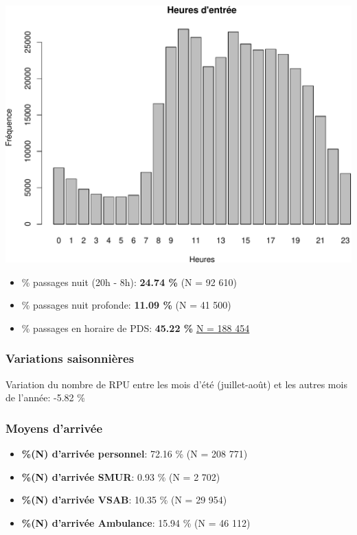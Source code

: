 \documentclass[]{article}
\begin{document}
\includegraphics{rapport2014_V4_files/figure-latex/horaires-1.pdf}

\begin{itemize}
\item
  \% passages nuit (20h - 8h): \textbf{24.74 \%} (N = 92 610)
\item
  \% passages nuit profonde: \textbf{11.09 \%} (N = 41 500)
\item
  \% passages en horaire de PDS: \textbf{45.22 \%}
  \href{Remarque:\%20ne\%20tient\%20pas\%20compte\%20des\%20jours\%20fériés\%20survenant\%20en\%20semaine}{N
  = 188 454}
\end{itemize}

\subsubsection{Variations saisonnières}\label{variations-saisonnieres}

Variation du nombre de RPU entre les mois d'été (juillet-août) et les
autres mois de l'année: -5.82 \%

\subsubsection{Moyens d'arrivée}\label{moyens-darrivee}

\begin{itemize}
\itemsep1pt\parskip0pt
\item
  \textbf{\%(N) d'arrivée personnel}: 72.16 \% (N = 208 771)
\item
  \textbf{\%(N) d'arrivée SMUR}: 0.93 \% (N = 2 702)
\item
  \textbf{\%(N) d'arrivée VSAB}: 10.35 \% (N = 29 954)
\item
  \textbf{\%(N) d'arrivée Ambulance}: 15.94 \% (N = 46 112)
\end{itemize}
\end{document}
